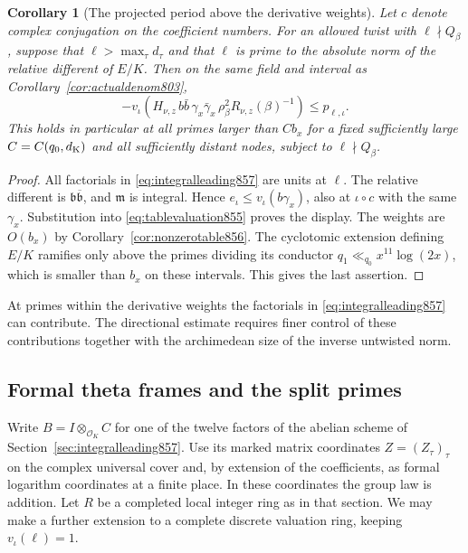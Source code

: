 \documentclass[a4paper,11pt]{article}
\newtheorem{corollary}[proposition]{Corollary}
\theoremstyle{definition}
\theoremstyle{remark}
\numberwithin{equation}{section}
\begin{document}
\begin{corollary}[The projected period above the derivative weights]
\leavevmode\label{cor:largeprimetable857}
Let \(c\) denote complex conjugation on the coefficient numbers.
For an allowed twist with \(\ell\nmid Q_\beta\), suppose that
\(\ell>\max_\tau d_\tau\) and that \(\ell\) is prime to the
absolute norm of the relative different of \(E/K\). Then on
the same field and interval as Corollary~\ref{cor:actualdenom803},
\[
 -v_\iota\!\left(
  H_{\nu,z}\,b\bar b\,\gamma_x\bar\gamma_x\,
             \rho_\beta^2 R_{\nu,z}(\beta)^{-1}\right)
       \le p_{\ell,\iota}.
\]
This holds in particular at all primes larger than \(C b_x\)
for a fixed sufficiently large \(C=C(q_0,d_{\rm K})\) and
all sufficiently distant nodes, subject to \(\ell\nmid Q_\beta\).
\end{corollary}
\begin{proof}
All factorials in \eqref{eq:integralleading857} are units at
\(\ell\). The relative different is
\(\mathfrak b\overline{\mathfrak b}\), and \(\mathfrak m\)
is integral. Hence \(e_\iota\le v_\iota(b\gamma_x)\), also
at \(\iota\circ c\) with the same \(\gamma_x\). Substitution
into \eqref{eq:tablevaluation855} proves the display.
The weights are \(O(b_x)\) by Corollary~\ref{cor:nonzerotable856}.
The cyclotomic extension defining \(E/K\) ramifies only above
the primes dividing its conductor \(q_1\ll_{q_0}x^{11}\log(2x)\),
which is smaller than \(b_x\) on these intervals. This gives
the last assertion.
\end{proof}

At primes within the derivative weights the factorials in
\eqref{eq:integralleading857} can contribute. The directional
estimate requires finer control of these contributions together
with the archimedean size of the inverse untwisted norm.
\clearpage

\subsection{Formal theta frames and the split primes}
\label{sec:twocopy858}
Write \(B=I\otimes_{\mathcal O_K}C\) for one of the twelve
factors of the abelian scheme of Section~\ref{sec:integralleading857}.
Use its marked matrix coordinates \(Z=(Z_\tau)_\tau\) on the
complex universal cover and, by extension of the coefficients,
as formal logarithm coordinates at a finite place. In these
coordinates the group law is addition. Let \(R\) be a completed
local integer ring as in that section. We may make a further
extension to a complete discrete valuation ring, keeping
\(v_\iota(\ell)=1\).
\end{document}
